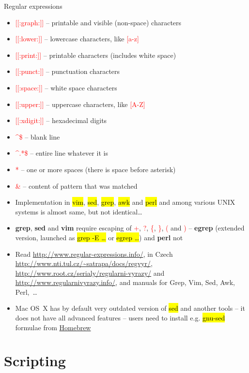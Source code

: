 \documentclass[compress, ucs, xelatex, 11pt, xcolor=svgnames,
  hyperref={
    bookmarks=true,
    unicode=true,
    colorlinks=true,
    pdftitle={Linux, command line and MetaCentrum},
    plainpages=false,
    pdfauthor={Vojtech Zeisek},
    pdfsubject={Course about use of Linux command line, writing shell scripts and using MetaCentrum of CESNET},
    pdfcreator={XeLaTeX},
    pdfkeywords={Linux, GNU, BASH, shell, command line, MetaCentrum},
    linkcolor=DarkRed,
    anchorcolor=DarkBlue,
    citecolor=Indigo,
    filecolor=NavyBlue,
    menucolor=DarkMagenta,
    urlcolor=DarkBlue,
    pdftex},
  url={hyphens, lowtilde} %
  ]{beamer}
\renewcommand{\texttt}[1]{\hl{\ttfamily #1}}
\renewcommand{\alert}[1]{\textcolor{red}{#1}}
\begin{document}
\begin{frame}[allowframebreaks]{Regular expressions}
\begin{itemize}
  \item \alert{[[:graph:]]} -- printable and visible (non-space) characters
  \item \alert{[[:lower:]]} -- lowercase characters, like \alert{[a-z]}
  \item \alert{[[:print:]]} -- printable characters (includes white space)
  \item \alert{[[:punct:]]} -- punctuation characters
  \item \alert{[[:space:]]} -- white space characters
  \item \alert{[[:upper:]]} -- uppercase characters, like \alert{[A-Z]}
  \item \alert{[[:xdigit:]]} -- hexadecimal digits
  \item \alert{\textasciicircum\$} -- blank line
  \item \alert{\textasciicircum.*\$} -- entire line whatever it is
  \item \alert{ *} -- one or more spaces (there is space before asterisk)
  \item \alert{\&} -- content of pattern that was matched
  \item Implementation in \texttt{vim}, \texttt{sed}, \texttt{grep}, \texttt{awk} and \texttt{perl} and among various UNIX systems is almost same, but not identical\ldots
  \item \textbf{grep}, \textbf{sed} and \textbf{vim} require escaping of \alert{+}, \alert{?}, \alert{\{}, \alert{\}}, \alert{(} and \alert{)} -- \textbf{egrep} (extended version, launched as \texttt{grep -E \ldots} or \texttt{egrep \ldots}) and \textbf{perl} not
  \item Read \url{http://www.regular-expressions.info/}, in Czech \url{http://www.nti.tul.cz/~satrapa/docs/regvyr/}, \url{http://www.root.cz/serialy/regularni-vyrazy/} and \url{http://www.regularnivyrazy.info/}, and manuals for Grep, Vim, Sed, Awk, Perl,~\ldots
  \item Mac OS~X has by default very outdated version of \texttt{sed} and another tools -- it does not have all advanced features -- users need to install e.g. \texttt{gnu-sed} formulae from \href{http://brew.sh/}{Homebrew}
\end{itemize}
\end{frame}

\section{Scripting}
\end{document}
